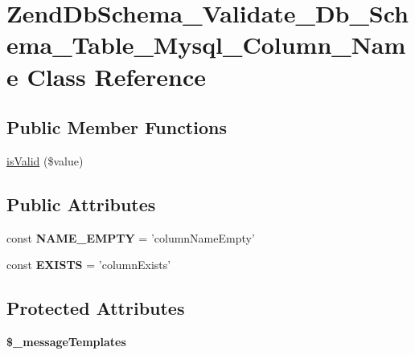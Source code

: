\hypertarget{classZendDbSchema__Validate__Db__Schema__Table__Mysql__Column__Name}{\section{\-Zend\-Db\-Schema\-\_\-\-Validate\-\_\-\-Db\-\_\-\-Schema\-\_\-\-Table\-\_\-\-Mysql\-\_\-\-Column\-\_\-\-Name \-Class \-Reference}
\label{classZendDbSchema__Validate__Db__Schema__Table__Mysql__Column__Name}
}
\subsection*{\-Public \-Member \-Functions}
\begin{DoxyCompactItemize}
\item 
\hyperlink{classZendDbSchema__Validate__Db__Schema__Table__Mysql__Column__Name_aa9b41a1e292fdac6ef8b8f4f0c2d8050}{is\-Valid} (\$value)
\end{DoxyCompactItemize}
\subsection*{\-Public \-Attributes}
\begin{DoxyCompactItemize}
\item 
\hypertarget{classZendDbSchema__Validate__Db__Schema__Table__Mysql__Column__Name_ae3d86f7c0b81ff1d532644a2c2ffe776}{const {\bfseries \-N\-A\-M\-E\-\_\-\-E\-M\-P\-T\-Y} = 'column\-Name\-Empty'}\label{classZendDbSchema__Validate__Db__Schema__Table__Mysql__Column__Name_ae3d86f7c0b81ff1d532644a2c2ffe776}

\item 
\hypertarget{classZendDbSchema__Validate__Db__Schema__Table__Mysql__Column__Name_a9597f6c3639eb7565a426ea61ff00de9}{const {\bfseries \-E\-X\-I\-S\-T\-S} = 'column\-Exists'}\label{classZendDbSchema__Validate__Db__Schema__Table__Mysql__Column__Name_a9597f6c3639eb7565a426ea61ff00de9}

\end{DoxyCompactItemize}
\subsection*{\-Protected \-Attributes}
\begin{DoxyCompactItemize}
\item 
{\bfseries \$\-\_\-message\-Templates}
\end{DoxyCompactItemize}


